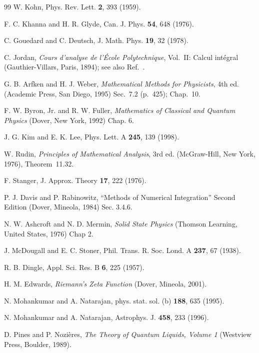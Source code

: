 \documentclass[aps,showkeys,noshowpacs,superscriptaddress,pre,preprint]{revtex4-2}
\begin{document}
\begin{thebibliography}{99}
 W. Kohn, Phys. Rev. Lett. \textbf{2}, 393 (1959).

 F. C. Khanna and H. R. Glyde, Can. J. Phys. \textbf{54}, 648 (1976).

 C. Gouedard and C. Deutsch, J. Math. Phys. \textbf{19}, 32 (1978).

 C. Jordan, \textit{Cours d'analyse de l'\'Ecole Polytechnique},
Vol.~II: Calcul int\'egral (Gauthier-Villars, Paris, 1894);
see also Ref.~\cite{Arfken-Weber1995}.

 G. B. Arfken and H. J. Weber, \textit{Mathematical Methods for Physicists}, 4th ed.
(Academic Press, San Diego, 1995) Sec.~7.2 (p.~425); Chap.~10.

 F. W. Byron, Jr. and R. W. Fuller, \textit{Mathematics of Classical and Quantum Physics} (Dover, New York, 1992) Chap. 6.

 J. G. Kim and E. K. Lee, Phys. Lett. A \textbf{245}, 139 (1998).

 W. Rudin, \textit{Principles of Mathematical Analysis}, 3rd ed.
(McGraw-Hill, New York, 1976), Theorem~11.32.

 F. Stanger, J. Approx. Theory \textbf{17}, 222 (1976).

 P. J. Davis and P. Rabinowitz, ``Methods of Numerical Integration'' Second Edition (Dover, Mineola, 1984) Sec. 3.4.6.

 N. W. Ashcroft and N. D. Mermin, \textit{Solid State Physics} (Thomson Learning, United States, 1976) Chap 2.

 J. McDougall and E. C. Stoner, Phil. Trans. R. Soc. Lond. A \textbf{237}, 67 (1938).

 R. B. Dingle, Appl. Sci. Res. B \textbf{6}, 225 (1957).

 H. M. Edwards, \textit{Riemann's Zeta Function} (Dover, Mineola, 2001).

 N. Mohankumar and A. Natarajan, phys. stat. sol. (b) \textbf{188}, 635 (1995).

 N. Mohankumar and A. Natarajan, Astrophys. J. \textbf{458}, 233 (1996).

 D. Pines and P. Nozi\`eres, \textit{The Theory of Quantum Liquids, Volume 1} (Westview Press, Boulder, 1989).


\end{thebibliography}
\end{document}
